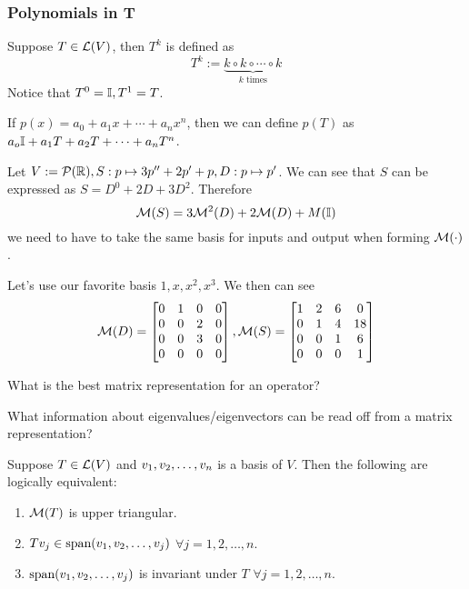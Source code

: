 \subsubsection{Polynomials in T}
\begin{definition}
    Suppose $T \in \mathcal L(V)$, then $T^k$ is defined as
    \[ T^k := \underbrace{k \circ k \circ \cdots \circ k}_{k \text{ times}}\]
    Notice that $T^0 = \mathbb I, T^1 = T$.
\end{definition}
\begin{definition}
    If $p(x) = a_0 + a_1x + \cdots + a_nx^n$, then we can define $p(T)$ as $a_o\mathbb I + a_1T + a_2T + \cdots + a_nT^n$.
\end{definition}
\begin{example}
    Let $V := \mathcal P(\mathbb R), S: p \mapsto 3p'' +  2p' + p, D: p \mapsto p'$. We can see that $S$ can be expressed as $S = D^0 + 2D + 3D^2$. Therefore \[\mathcal M(S) = 3\mathcal M^2(D) + 2\mathcal M(D) + M(\mathbb I)\] we need to have to take the same basis for inputs and output when forming $\mathcal M(\cdot)$.  
    
    \noindent Let's use our favorite basis $1,x,x^2, x^3$. We then can see
    \[ \mathcal M(D) = \begin{bmatrix} 0 & 1 & 0 & 0 \\ 0 & 0 & 2 & 0 \\ 0 & 0 & 3 & 0 \\ 0 & 0 & 0 & 0 \end{bmatrix}, \mathcal M(S) = \begin{bmatrix} 1 & 2 & 6 & 0\\ 0 & 1 & 4 & 18\\ 0 & 0 & 1 & 6 \\ 0 & 0 & 0 & 1 \end{bmatrix}\]
\end{example}
\begin{question}
    What is the best matrix representation for an operator?
\end{question}
\begin{question}
    What information about eigenvalues/eigenvectors can be read off from a matrix representation?
\end{question}
\begin{theorem}
    Suppose $T \in \mathcal L(V)$ and ${v}_1,{v}_2, \ldots, {v}_{n}$ is a basis of $V$. Then the following are logically equivalent:
    \begin{enumerate}
        \item  $\mathcal M(T)$ is upper triangular.
        \item $Tv_j \in \text{span} ({v}_1,{v}_2, \ldots, {v}_{j})$ $\forall j = 1,2, \ldots, n$.
        \item $\text{span} ({v}_1,{v}_2, \ldots, {v}_{j})$ is invariant under $T$ $\forall j = 1,2,\ldots, n$.
    \end{enumerate}
\end{theorem}
